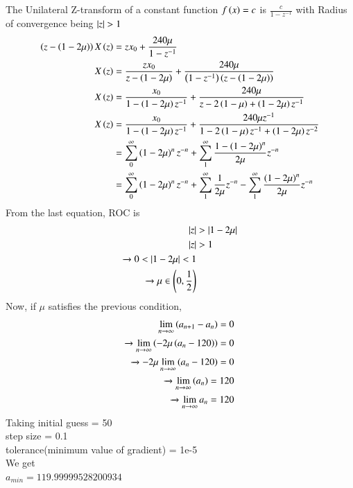 \documentclass[journal]{IEEEtran}
\begin{document}
The Unilateral Z-transform of a constant function $f\left(x\right) = c$ is $\frac{c}{1-z^{-1}}$ with Radius of convergence being $\left\vert z\right\vert>1$
\begin{align}
    \left(z - \left(1-2\mu\right)\right)X\left(z\right) &= zx_0+\frac{240\mu}{1-z^{-1}}\\
    X\left(z\right) &= \frac{zx_0}{z - \left(1-2\mu\right)}+\frac{240\mu}{\left(1-z^{-1}\right)\left(z - \left(1-2\mu\right)\right)}\\
    X\left(z\right) &= \frac{x_0}{1 - \left(1-2\mu\right)z^{-1}}+\frac{240\mu}{z-2\left(1-\mu\right)+\left(1-2\mu\right)z^{-1}}\\
    X\left(z\right) &= \frac{x_0}{1 - \left(1-2\mu\right)z^{-1}}+\frac{240\mu z^{-1}}{1-2\left(1-\mu\right)z^{-1}+\left(1-2\mu\right)z^{-2}}\\
    &= \sum_{0}^{\infty} \left(1-2\mu\right)^n z^{-n}+\sum_{1}^{\infty}\frac{1-\left(1-2\mu\right)^n}{2\mu}z^{-n}\\
    &= \sum_{0}^{\infty} \left(1-2\mu\right)^n z^{-n}+\sum_{1}^{\infty}\frac{1}{2\mu}z^{-n}-\sum_{1}^{\infty}\frac{\left(1-2\mu\right)^n}{2\mu}z^{-n}\\
\end{align}
From the last equation, ROC is 
\begin{align}
    \left\vert z\right\vert &> \left\vert1-2\mu\right\vert\\
    \left\vert z\right\vert &> 1 \\
    \xrightarrow{} 0 < |1-2\mu| < 1\\
    \xrightarrow{} \mu \in \left(0, \frac{1}{2}\right)
\end{align}
Now, if $\mu$ satisfies the previous condition,
\begin{align}
    \lim_{n \to \infty} \left(a_{n+1} - a_n\right) = 0\\
    \xrightarrow{} \lim_{n \to \infty} \left(- 2\mu\left(a_n-120\right)\right) = 0\\
    \xrightarrow{} {-2\mu}\lim_{n \to \infty} \left(a_n-120\right) = 0\\
    \xrightarrow{} \lim_{n \to \infty} \left(a_n\right) = 120\\
    \xrightarrow{} \lim_{n \to \infty} a_n = 120
\end{align}
Taking initial guess = 50\\ step size = 0.1\\ tolerance(minimum value of gradient) = 1e-5\\ We get \\
$a_{min} = 119.99999528200934$\\
\end{document}
